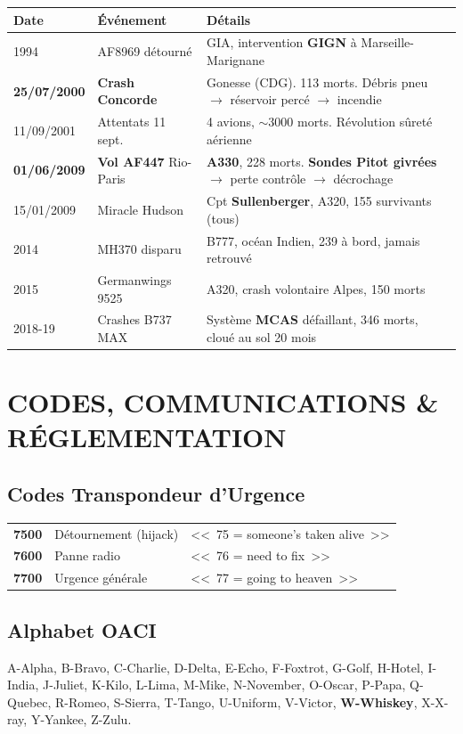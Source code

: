 \documentclass[11pt,a4paper]{article}
\begin{document}
\begin{longtable}{p{2cm}p{3.5cm}p{9cm}}
\toprule
\textbf{Date} & \textbf{Événement} & \textbf{Détails} \\
\midrule
1994 & AF8969 détourné & GIA, intervention \textbf{GIGN} à Marseille-Marignane \\
\rowcolor{warnred}
\textbf{25/07/2000} & \textbf{Crash Concorde} & Gonesse (CDG). 113 morts. Débris pneu $\to$ réservoir percé $\to$ incendie \\
11/09/2001 & Attentats 11 sept. & 4 avions, $\sim$3000 morts. Révolution sûreté aérienne \\
\rowcolor{warnred}
\textbf{01/06/2009} & \textbf{Vol AF447} Rio-Paris & \textbf{A330}, 228 morts. \textbf{Sondes Pitot givrées} $\to$ perte contrôle $\to$ décrochage \\
15/01/2009 & Miracle Hudson & Cpt \textbf{Sullenberger}, A320, 155 survivants (tous) \\
2014 & MH370 disparu & B777, océan Indien, 239 à bord, jamais retrouvé \\
2015 & Germanwings 9525 & A320, crash volontaire Alpes, 150 morts \\
2018-19 & Crashes B737 MAX & Système \textbf{MCAS} défaillant, 346 morts, cloué au sol 20 mois \\
\bottomrule
\end{longtable}

\section{CODES, COMMUNICATIONS \& RÉGLEMENTATION}

\subsection{Codes Transpondeur d'Urgence}

\begin{tabular}{p{2cm}p{4cm}p{8.5cm}}
\toprule
\textbf{7500} & Détournement (hijack) & <<~75 = someone's taken alive~>> \\
\textbf{7600} & Panne radio & <<~76 = need to fix~>> \\
\textbf{7700} & Urgence générale & <<~77 = going to heaven~>> \\
\bottomrule
\end{tabular}

\subsection{Alphabet OACI}
A-Alpha, B-Bravo, C-Charlie, D-Delta, E-Echo, F-Foxtrot, G-Golf, H-Hotel, I-India, J-Juliet, K-Kilo, L-Lima, M-Mike, N-November, O-Oscar, P-Papa, Q-Quebec, R-Romeo, S-Sierra, T-Tango, U-Uniform, V-Victor, \textbf{W-Whiskey}, X-X-ray, Y-Yankee, Z-Zulu.
\end{document}
